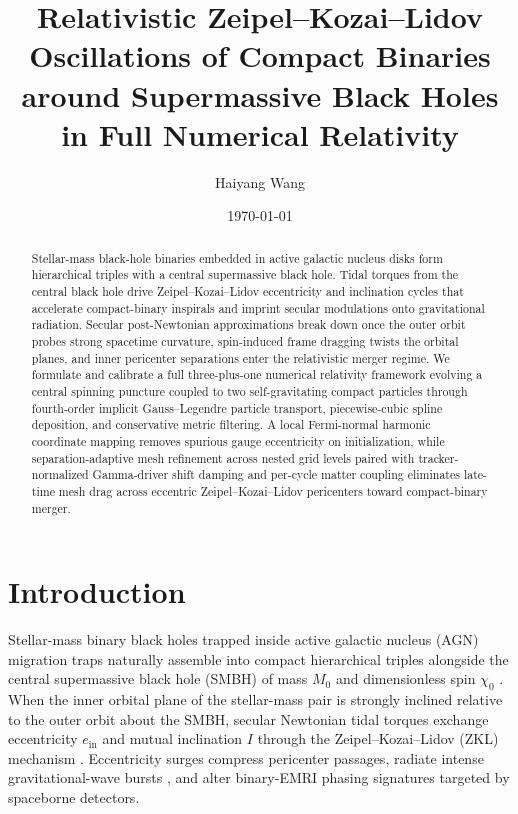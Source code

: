\documentclass[aps,prl,twocolumn,10pt,superscriptaddress,nofootinbib,longbibliography,floatfix]{revtex4-2}
\newcommand{\Mzero}{M_0}
\newcommand{\chizero}{\chi_0}
\newcommand{\ein}{e_{\mathrm{in}}}
\begin{document}
\title{Relativistic Zeipel--Kozai--Lidov Oscillations of Compact Binaries\texorpdfstring{\\}{ }around Supermassive Black Holes in Full Numerical Relativity}

\author{Haiyang Wang}

\date{\today}

\begin{abstract}
Stellar-mass black-hole binaries embedded in active galactic nucleus disks form hierarchical triples with a central supermassive black hole. Tidal torques from the central black hole drive Zeipel--Kozai--Lidov eccentricity and inclination cycles that accelerate compact-binary inspirals and imprint secular modulations onto gravitational radiation. Secular post-Newtonian approximations break down once the outer orbit probes strong spacetime curvature, spin-induced frame dragging twists the orbital planes, and inner pericenter separations enter the relativistic merger regime. We formulate and calibrate a full three-plus-one numerical relativity framework evolving a central spinning puncture coupled to two self-gravitating compact particles through fourth-order implicit Gauss--Legendre particle transport, piecewise-cubic spline deposition, and conservative metric filtering. A local Fermi-normal harmonic coordinate mapping removes spurious gauge eccentricity on initialization, while separation-adaptive mesh refinement across nested grid levels paired with tracker-normalized Gamma-driver shift damping and per-cycle matter coupling eliminates late-time mesh drag across eccentric Zeipel--Kozai--Lidov pericenters toward compact-binary merger.
\end{abstract}

\maketitle

\section{Introduction}
Stellar-mass binary black holes trapped inside active galactic nucleus (AGN) migration traps naturally assemble into compact hierarchical triples alongside the central supermassive black hole (SMBH) of mass $\Mzero$ and dimensionless spin $\chizero$ \cite{Hoang:2018,Liu:2018,Liu:2019}. When the inner orbital plane of the stellar-mass pair is strongly inclined relative to the outer orbit about the SMBH, secular Newtonian tidal torques exchange eccentricity $\ein$ and mutual inclination $I$ through the Zeipel--Kozai--Lidov (ZKL) mechanism \cite{vonZeipel:1910,Kozai:1962,Lidov:1962,Naoz:2016}. Eccentricity surges compress pericenter passages, radiate intense gravitational-wave bursts \cite{Blaes:2002,Randall:2018}, and alter binary-EMRI phasing signatures targeted by spaceborne detectors.
\end{document}

